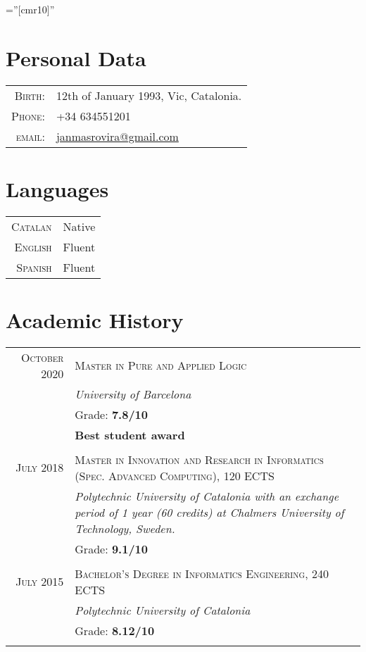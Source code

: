 \documentclass[a4paper,10pt]{article}
\begin{document}
\pagestyle{empty}

\font\fb=''[cmr10]''

\par{\bigskip\par}

\section{Personal Data}

\begin{tabular}{rl}
\textsc{Birth:} & 12th of January 1993, Vic, Catalonia.\\
\textsc{Phone:} & +34 634551201\\
\textsc{email:} & \href{mailto:janmasrovira@gmail.com}{janmasrovira@gmail.com}
\end{tabular}
\section{Languages}

\begin{tabular}{rl}
  \textsc{Catalan} & Native \\
  \textsc{English} & Fluent \\
  \textsc{Spanish} & Fluent \\
\end{tabular}


\section{Academic History}

\begin{tabular}{r|p{11cm}}
  \textsc{October 2020} & \textsc{Master in Pure and Applied Logic} \\
 & \emph{University of Barcelona}\\
   & Grade: \textbf{7.8/10} \\
   & \textbf{Best student award} \\
\multicolumn{2}{c}{} \\

  \textsc{July 2018} & \textsc{Master in Innovation and Research in Informatics (Spec. Advanced Computing), 120 ECTS} \\
               & \emph{Polytechnic University of Catalonia with an exchange period of 1 year (60 credits) at Chalmers University of Technology, Sweden.}\\
  & Grade: \textbf{9.1/10} \\
  \multicolumn{2}{c}{} \\

  \textsc{July 2015} & \textsc{Bachelor's Degree in Informatics Engineering, 240 ECTS} \\
               & \emph{Polytechnic University of Catalonia}\\
               & Grade: \textbf{8.12/10} \\
  \multicolumn{2}{c}{} \\
\end{tabular}
\end{document}
